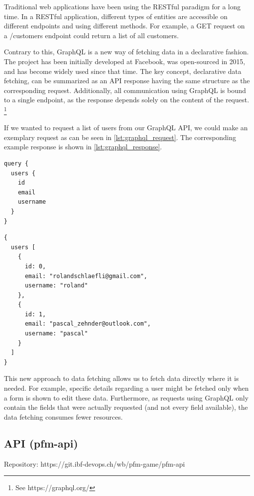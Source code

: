 Traditional web applications have been using the RESTful paradigm for a long time. In a RESTful application, different types of entities are accessible on different endpoints and using different methods. For example, a GET request on a /customers endpoint could return a list of all customers.

Contrary to this, GraphQL is a new way of fetching data in a declarative fashion. The project has been initially developed at Facebook, was open-sourced in 2015, and has become widely used since that time. The key concept, declarative data fetching, can be summarized as an API response having the same structure as the corresponding request. Additionally, all communication using GraphQL is bound to a single endpoint, as the response depends solely on the content of the request. \footnote{See https://graphql.org/}

If we wanted to request a list of users from our GraphQL API, we could make an exemplary request as can be seen in \cref{lst:graphql_request}. The corresponding example response is shown in \cref{lst:graphql_response}.

\begin{multicols}{2}
  \begin{lstlisting}[caption=GraphQL request, label=lst:graphql_request]
query {
  users {
    id
    email
    username
  }
}
  \end{lstlisting}
  \vfill
  \columnbreak
  \begin{lstlisting}[caption=GraphQL response, label=lst:graphql_response]
{
  users [
    {
      id: 0,
      email: "rolandschlaefli@gmail.com",
      username: "roland"
    },
    {
      id: 1,
      email: "pascal_zehnder@outlook.com",
      username: "pascal"
    }
  ]
}
  \end{lstlisting}
\end{multicols}

This new approach to data fetching allows us to fetch data directly where it is needed. For example, specific details regarding a user might be fetched only when a form is shown to edit these data. Furthermore, as requests using GraphQL only contain the fields that were actually requested (and not every field available), the data fetching consumes fewer resources.


\subsection{API (pfm-api)}

Repository: https://git.ibf-devops.ch/wb/pfm-game/pfm-api


